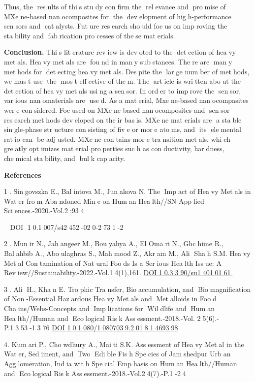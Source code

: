 {Thus, the results of this study confirm the relevance and
promise of MXene-based nanocomposites for the development of
high-performance sensors and catalysts. Future research should
focus on improving the stability and fabrication processes of
these materials.

{\bfseries Conclusion.} This literature review is devoted to the
detection of heavy metals. Heavy metals are found in many
substances. There are many methods for detecting heavy metals.
Despite the large number of methods, we must use the most
effective of them. The article is written about the detection of
heavy metals using a sensor. In order to improve the sensor,
various nanomaterials are used. As a material, Mxene-based
nanocompasites were considered. Focused on MXene-based
nanocomposites and sensor research methods developed on their
basis. MXene materials are a stable single-phase structure
consisting of five or more atoms, and its elemental ratio can
be adjusted. MXene contains more transition metals, which
greatly optimizes material properties such as conductivity,
hardness, chemical stability, and bulk capacity.

{\bfseries References}

1. Singovszka E., Balintova M., Junakova N. The Impact of Heavy
Metals in Water from Abandoned Mine on Human Health//SN Applied
Sciences.-2020.-Vol.2:934

 DOI 10.1007/s42452-020-2731-2

2. Munir N., Jahangeer M., Bouyahya A., El Omari N., Ghchime R.,
Balahbib A., Aboulaghras S., Mahmood Z., Akram M., Ali Shah S.M.
Heavy Metal Contamination of Natural Foods Is a Serious Health
Issue: A Review//Sustainability.-2022.-Vol.14(1),161.
\href{https://doi.org/10.3390/su14010161}{DOI 10.3390/su14010161}

3. Ali H., Khan E. Trophic Transfer, Bioaccumulation, and
Biomagnification of Non-Essential Hazardous Heavy Metals and
Metalloids in Food Chains/Webs-Concepts and Implications for
Wildlife and Human Health//Human and Ecological Risk
Assessment.-2018.-Vol. 25(6).-P.1353-1376
\href{https://doi.org/10.1080/10807039.2018.1469398}{DOI
10.1080/10807039.2018.1469398}

4. Kumari P., Chowdhury A., Maiti S.K. Assessment of Heavy Metal
in the Water, Sediment, and Two Edible Fish Species of
Jamshedpur Urban Agglomeration, India with Special Emphasis on
Human Health//Human and Ecological Risk
Assessment.-2018.-Vol.24(7).-P.1-24

}
